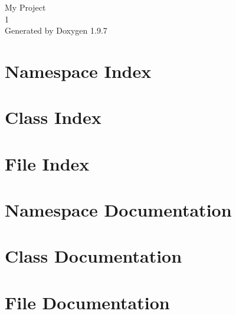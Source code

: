 \documentclass[twoside]{book}
\newcommand{\+}{\discretionary{\mbox{\scriptsize$\hookleftarrow$}}{}{}}
\newcommand{\clearemptydoublepage}{%
    \newpage{\pagestyle{empty}\cleardoublepage}%
  }
\begin{document}
  \raggedbottom
    \hypersetup{pageanchor=false,
                bookmarksnumbered=true,
                pdfencoding=unicode
               }
  \begin{titlepage}
  \vspace*{7cm}
  \begin{center}%
  {\Large My Project}\\
  [1ex]\large 1 \\
  \vspace*{1cm}
  {\large Generated by Doxygen 1.9.7}\\
  \end{center}
  \end{titlepage}
  \clearemptydoublepage
  \tableofcontents
  \clearemptydoublepage
  \hypersetup{pageanchor=true}
\chapter{Namespace Index}

\chapter{Class Index}

\chapter{File Index}

\chapter{Namespace Documentation}


\chapter{Class Documentation}






\chapter{File Documentation}








  \backmatter
  \newpage
  \clearemptydoublepage
  \printindex
\end{document}
